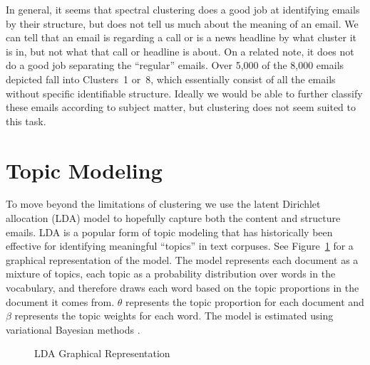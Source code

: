 \documentclass[12pt]{article}
\theoremstyle{definition}
\theoremstyle{algodesc}
\begin{document}
In general, it seems that spectral clustering does a good job at identifying emails by their structure, but does not tell us much about the meaning of an email. We can tell that an email is regarding a call or is a news headline by what cluster it is in, but not what that call or headline is about. On a related note, it does not do a good job separating the ``regular'' emails. Over 5,000 of the 8,000 emails depicted fall into Clusters~1 or~8, which essentially consist of all the emails without specific identifiable structure. Ideally we would be able to further classify these emails according to subject matter, but clustering does not seem suited to this task.


\section{Topic Modeling}
To move beyond the limitations of clustering we use the latent Dirichlet allocation (LDA) model to hopefully capture both the content and structure emails. LDA is a popular form of topic modeling that has historically been effective for identifying meaningful ``topics'' in text corpuses. See Figure~\ref{fig:lda_graph} for a graphical representation of the model. The model represents each document as a mixture of topics, each topic as a probability distribution over words in the vocabulary, and therefore draws each word based on the topic proportions in the document it comes from. $\theta$ represents the topic proportion for each document and $\beta$ represents the topic weights for each word. The model is estimated using variational Bayesian methods \citep[for more details, see][]{bleilafferty09}.

\begin{figure}
\centering
{}
\caption{LDA Graphical Representation}
\label{fig:lda_graph}
\end{figure}
\end{document}
